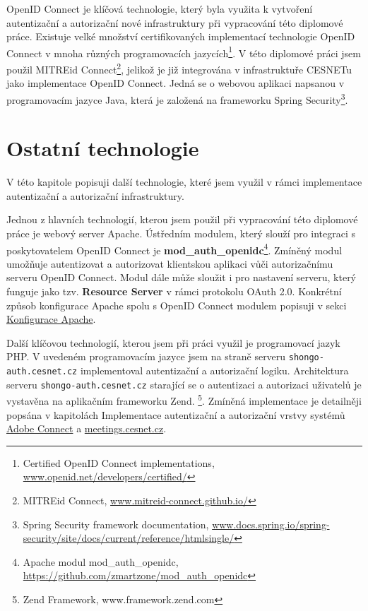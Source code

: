 \documentclass[
  printed, %
  twoside, %
  table,   %
  nolof,     %
  nolot,     %
]{fithesis3}
\begin{document}
\par
OpenID Connect je klíčová technologie, který byla využita k vytvoření autentizační a autorizační nové infrastruktury při vypracování této diplomové práce. Existuje velké množství certifikovaných implementací technologie OpenID Connect v mnoha různých programovacích jazycích\footnote{Certified OpenID Connect implementations, \url{www.openid.net/developers/certified/}}. V této diplomové práci jsem použil MITREid Connect\footnote{MITREid Connect, \url{www.mitreid-connect.github.io/}}, jelikož je již integrována v infrastruktuře CESNETu jako implementace OpenID Connect. Jedná se o webovou aplikaci napsanou v programovacím jazyce Java, která je založená na frameworku Spring Security\footnote{Spring Security framework documentation, \url{www.docs.spring.io/spring-security/site/docs/current/reference/htmlsingle/}}. 

\section{Ostatní technologie}
V této kapitole popisuji další technologie, které jsem využil v rámci implementace autentizační a autorizační infrastruktury. 
\par
Jednou z hlavních technologií, kterou jsem použil při vypracování této diplomové práce je webový server Apache. Ústředním modulem, který slouží pro integraci s poskytovatelem OpenID Connect je \textbf{mod\_auth\_openidc}\footnote{Apache modul mod\_auth\_openidc, \url{https://github.com/zmartzone/mod\_auth\_openidc}}. Zmíněný modul umožňuje autentizovat a autorizovat klientskou aplikaci vůči autorizačnímu serveru OpenID Connect. Modul dále může sloužit i pro nastavení serveru, který funguje jako tzv. \textbf{Resource Server} v rámci protokolu OAuth 2.0. Konkrétní způsob konfigurace Apache spolu s OpenID Connect modulem popisuji v sekci \hyperref[apacheConfig]{Konfigurace Apache}.

\par
Další klíčovou technologií, kterou jsem při práci využil je programovací jazyk PHP. V uvedeném programovacím jazyce jsem na straně serveru \texttt{shongo-auth.cesnet.cz} implementoval autentizační a autorizační logiku. Architektura serveru \texttt{shongo-auth.cesnet.cz} starající se o autentizaci a autorizaci uživatelů je vystavěna na aplikačním frameworku Zend. \footnote{Zend Framework, www.framework.zend.com}. Zmíněná implementace je detailněji popsána v kapitolách Implementace autentizační a autorizační vrstvy systémů \hyperref[ACImpl]{Adobe Connect} a \hyperref[ShongoImpl]{meetings.cesnet.cz}. 
\end{document}
